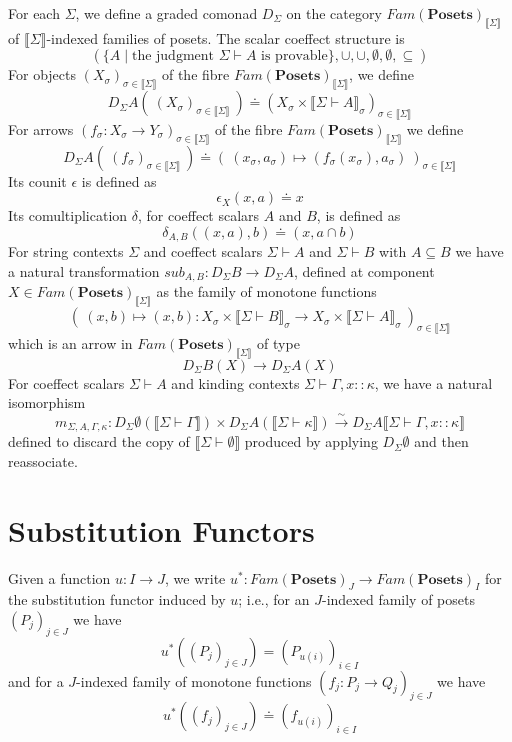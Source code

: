 \documentclass{article}
\newcommand{\mbf}{\mathbf}
\newcommand{\sem}[1]{\llbracket #1 \rrbracket}
\newcommand{\sdisp}[1]{
\left( #1 \right)
}
\begin{document}
For each $\Sigma$, we define a graded comonad $D_{\Sigma}$ on the category $\mathit{Fam}(\mbf{Posets})_{\sem{\Sigma}}$ of $\sem{\Sigma}$-indexed families of posets. The scalar coeffect structure is $$( \{ A \mid \text{the judgment } \Sigma \vdash A \text{ is provable} \}, \cup, \cup, \emptyset, \emptyset, \subseteq)$$ For objects $(X_\sigma)_{\sigma \in \sem{\Sigma}}$ of the fibre $\mathit{Fam}(\mbf{Posets})_{\sem{\Sigma}}$, we define $$D_{\Sigma} A(~(X_\sigma)_{\sigma \in \sem{\Sigma}}~) \doteq (X_\sigma \times \sem{\Sigma \vdash A}_\sigma)_{\sigma \in \sem{\Sigma}}$$ For arrows $(f_\sigma : X_\sigma \to Y_\sigma)_{\sigma \in \sem{\Sigma}}$ of the fibre $\mathit{Fam}(\mbf{Posets})_{\sem{\Sigma}}$ we define $$D_{\Sigma} A(~(f_\sigma)_{\sigma \in \sem{\Sigma}}~) \doteq (~(x_\sigma, a_\sigma) \mapsto (f_\sigma(x_\sigma),a_\sigma)~)_{\sigma \in \sem{\Sigma}}$$ Its counit $\epsilon$ is defined as $$\epsilon_X(x,a) \doteq x
$$ Its comultiplication $\delta$, for coeffect scalars $A$ and $B$, is defined as $$\delta_{A,B}((x,a),b) \doteq (x, a \cap b)$$ For string contexts $\Sigma$ and coeffect scalars $\Sigma \vdash A$ and $\Sigma \vdash B$ with $A \subseteq B$ we have a natural transformation $\mathit{sub}_{A,B} : D_{\Sigma} B \to D_{\Sigma } A$, defined at component $X \in \mathit{Fam}(\mbf{Posets})_{\sem{\Sigma}}$ as the family of monotone functions $$(~(x,b) \mapsto (x,b) : X_\sigma \times \sem{\Sigma \vdash B}_\sigma \to X_{\sigma} \times \sem{\Sigma \vdash A}_{\sigma}~)_{\sigma \in \sem{\Sigma}}$$
which is an arrow in $\mathit{Fam}(\mbf{Posets})_{\sem{\Sigma}}$ of type $$D_{\Sigma}B(X) \to D_{\Sigma}A(X)$$
For coeffect scalars $\Sigma \vdash A$ and kinding contexts $\Sigma \vdash \Gamma,x :: \kappa$, we have a natural isomorphism $$m_{\Sigma,A,\Gamma,\kappa} : D_{\Sigma} \emptyset(\sem{\Sigma \vdash \Gamma}) \times D_{\Sigma} A( \sem{\Sigma \vdash \kappa} ) \overset{\sim}{\to} D_{\Sigma} A \sem{\Sigma \vdash \Gamma,x :: \kappa}$$ defined to discard the copy of $\sem{\Sigma \vdash \emptyset}$ produced by applying $D_{\Sigma} \emptyset$ and then reassociate.

\section*{Substitution Functors}

Given a function $u : I \to J$, we write $u^* : \mathit{Fam}(\mbf{Posets})_J \to \mathit{Fam}(\mbf{Posets})_I$ for the substitution functor induced by $u$; i.e., for an $J$-indexed family of posets $\sdisp{P_j}_{j \in J}$ we have $$u^* (\sdisp{P_j}_{j \in J}) = \sdisp{ P_{u(i)} }_{i \in I}$$ and for a $J$-indexed family of monotone functions $(f_j : P_j \to Q_j)_{j \in J}$ we have $$u^*(\sdisp{f_j}_{j \in J}) \doteq \sdisp{f_{u(i)}}_{i \in I}$$
\end{document}
